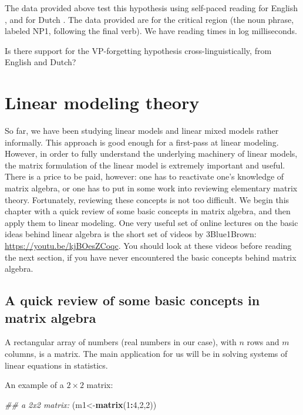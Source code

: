 \documentclass[12pt,]{krantz}
\newenvironment{Shaded}{\begin{snugshade}}{\end{snugshade}}
\newcommand{\CommentTok}[1]{\textcolor[rgb]{0.56,0.35,0.01}{\textit{#1}}}
\newcommand{\DecValTok}[1]{\textcolor[rgb]{0.00,0.00,0.81}{#1}}
\newcommand{\KeywordTok}[1]{\textcolor[rgb]{0.13,0.29,0.53}{\textbf{#1}}}
\newcommand{\NormalTok}[1]{#1}
\newcommand{\OperatorTok}[1]{\textcolor[rgb]{0.81,0.36,0.00}{\textbf{#1}}}
\begin{document}
The data provided above test this hypothesis using self-paced reading for English \citep{VSLK08}, and for Dutch \citep{FrankEtAl2015}. The data provided are for the critical region (the noun phrase, labeled NP1, following the final verb). We have reading times in log milliseconds.

Is there support for the VP-forgetting hypothesis cross-linguistically, from English and Dutch?

\hypertarget{ch:LMtheory}{%
\chapter{Linear modeling theory}\label{ch:LMtheory}}

So far, we have been studying linear models and linear mixed models rather informally. This approach is good enough for a first-pass at linear modeling. However, in order to fully understand the underlying machinery of linear models, the matrix formulation of the linear model is extremely important and useful. There is a price to be paid, however: one has to reactivate one's knowledge of matrix algebra, or one has to put in some work into reviewing elementary matrix theory. Fortunately, reviewing these concepts is not too difficult. We begin this chapter with a quick review of some basic concepts in matrix algebra, and then apply them to linear modeling. One very useful set of online lectures on the basic ideas behind linear algebra is the short set of videos by 3Blue1Brown: \url{https://youtu.be/kjBOesZCoqc}. You should look at these videos before reading the next section, if you have never encountered the basic concepts behind matrix algebra.

\hypertarget{a-quick-review-of-some-basic-concepts-in-matrix-algebra}{%
\section{A quick review of some basic concepts in matrix algebra}\label{a-quick-review-of-some-basic-concepts-in-matrix-algebra}}

A rectangular array of numbers (real numbers in our case), with \(n\) rows and \(m\) columns, is a matrix. The main application for us will be in solving systems of linear equations in statistics.

An example of a \(2\times 2\) matrix:

\begin{Shaded}
\begin{Highlighting}[]
\CommentTok{## a 2x2 matrix:}
\NormalTok{(m1<-}\KeywordTok{matrix}\NormalTok{(}\DecValTok{1}\OperatorTok{:}\DecValTok{4}\NormalTok{,}\DecValTok{2}\NormalTok{,}\DecValTok{2}\NormalTok{))}
\end{Highlighting}
\end{Shaded}
\end{document}
